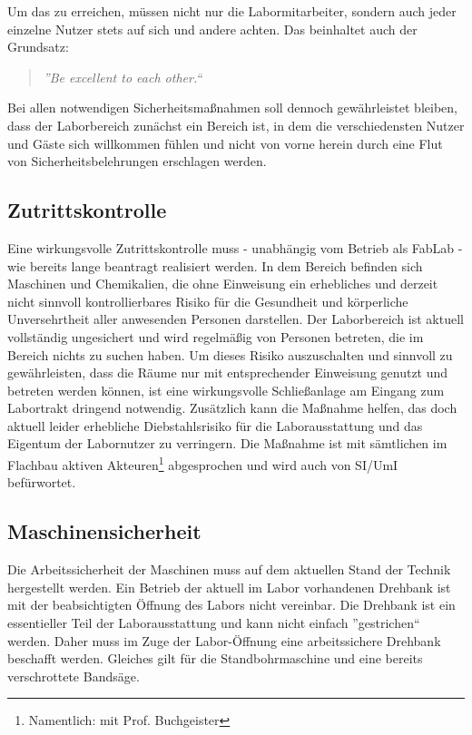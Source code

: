 \documentclass[parskip=half,headsepline,footsepline,titlepage]{scrartcl}
\begin{document}
\samepage Um das zu erreichen, müssen nicht nur die Labormitarbeiter, sondern auch jeder einzelne Nutzer stets auf sich und andere achten. Das beinhaltet auch der Grundsatz:
\begin{quote}\emph{''Be excellent to each other.``}\end{quote}


Bei allen notwendigen Sicherheitsmaßnahmen soll dennoch gewährleistet bleiben, dass der Laborbereich zunächst ein Bereich ist, in dem die verschiedensten Nutzer und Gäste sich willkommen fühlen und nicht von vorne herein durch eine Flut von Sicherheitsbelehrungen erschlagen werden.

\subsection{Zutrittskontrolle}
Eine wirkungsvolle Zutrittskontrolle muss - unabhängig vom Betrieb als FabLab - wie bereits lange beantragt realisiert werden. In dem Bereich befinden sich Maschinen und Chemikalien, die ohne Einweisung ein erhebliches und derzeit nicht sinnvoll kontrollierbares Risiko für die Gesundheit und körperliche Unversehrtheit aller anwesenden Personen darstellen. Der Laborbereich ist aktuell vollständig ungesichert und wird regelmäßig von Personen betreten, die im Bereich nichts zu suchen haben. Um dieses Risiko auszuschalten und sinnvoll zu gewährleisten, dass die Räume nur mit entsprechender Einweisung genutzt und betreten werden können, ist eine wirkungsvolle Schließanlage am Eingang zum Labortrakt dringend notwendig. Zusätzlich kann die Maßnahme helfen, das doch aktuell leider erhebliche Diebstahlsrisiko für die Laborausstattung und das Eigentum der Labornutzer zu verringern. Die Maßnahme ist mit sämtlichen im Flachbau aktiven Akteuren\footnote{Namentlich: mit Prof. Buchgeister} abgesprochen und wird auch von SI/UmI befürwortet.

\subsection{Maschinensicherheit}
Die Arbeitssicherheit der Maschinen muss auf dem aktuellen Stand der Technik hergestellt werden.
Ein Betrieb der aktuell im Labor vorhandenen Drehbank ist mit der beabsichtigten Öffnung des Labors nicht vereinbar. Die Drehbank ist ein essentieller Teil der Laborausstattung und kann nicht einfach ''gestrichen`` werden. Daher muss im Zuge der Labor-Öffnung eine arbeitssichere Drehbank beschafft werden. Gleiches gilt für die Standbohrmaschine und eine bereits verschrottete Bandsäge.
\end{document}

